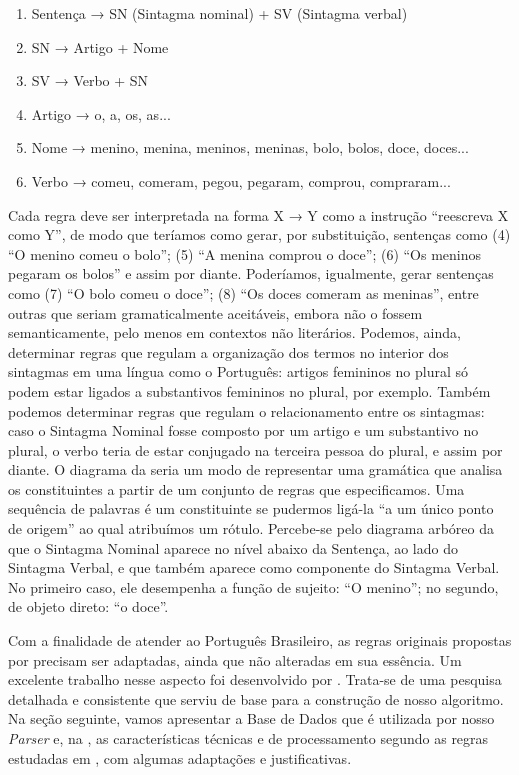 \documentclass[portuguese]{textolivre}
\begin{document}
\begin{enumerate}[topsep=10pt]
    \item Sentença → SN (Sintagma nominal) + SV (Sintagma verbal)
    \item SN → Artigo + Nome
    \item SV → Verbo + SN
    \item Artigo → o, a, os, as...
    \item Nome → menino, menina, meninos, meninas, bolo, bolos, doce, doces...
    \item Verbo → comeu, comeram, pegou, pegaram, comprou, compraram...
\end{enumerate}

Cada regra deve ser interpretada na forma X → Y como a instrução “reescreva X como Y”, de modo que teríamos como gerar, por substituição, sentenças como (4) “O menino comeu o bolo”; (5) “A menina comprou o doce”; (6) “Os meninos pegaram os bolos” e assim por diante. Poderíamos, igualmente, gerar sentenças como (7) “O bolo comeu o doce”; (8) “Os doces comeram as meninas”, entre outras que seriam gramaticalmente aceitáveis, embora não o fossem semanticamente, pelo menos em contextos não literários. Podemos, ainda, determinar regras que regulam a organização dos termos no interior dos sintagmas em uma língua como o Português: artigos femininos no plural só podem estar ligados a substantivos femininos no plural, por exemplo. Também podemos determinar regras que regulam o relacionamento entre os sintagmas: caso o Sintagma Nominal fosse composto por um artigo e um substantivo no plural, o verbo teria de estar conjugado na terceira pessoa do plural, e assim por diante. O diagrama da  seria um modo de representar uma gramática que analisa os constituintes a partir de um conjunto de regras que especificamos. Uma sequência de palavras é um constituinte se pudermos ligá-la “a um único ponto de origem” ao qual atribuímos um rótulo. Percebe-se pelo diagrama arbóreo da  que o Sintagma Nominal aparece no nível abaixo da Sentença, ao lado do Sintagma Verbal, e que também aparece como componente do Sintagma Verbal. No primeiro caso, ele desempenha a função de sujeito: “O menino”; no segundo, de objeto direto: “o doce”.

Com a finalidade de atender ao Português Brasileiro, as regras originais propostas por \textcite{chomsky_estruturas_2015} precisam ser adaptadas, ainda que não alteradas em sua essência. Um excelente trabalho nesse aspecto foi desenvolvido por \textcite{othero_gramatica_2009}. Trata-se de uma pesquisa detalhada e consistente que serviu de base para a construção de nosso algoritmo. Na seção seguinte, vamos apresentar a Base de Dados que é utilizada por nosso \textit{Parser} e, na , as características técnicas e de processamento segundo as regras estudadas em \textcite[p. 142]{othero_gramatica_2009}, com algumas adaptações e justificativas.
\end{document}
